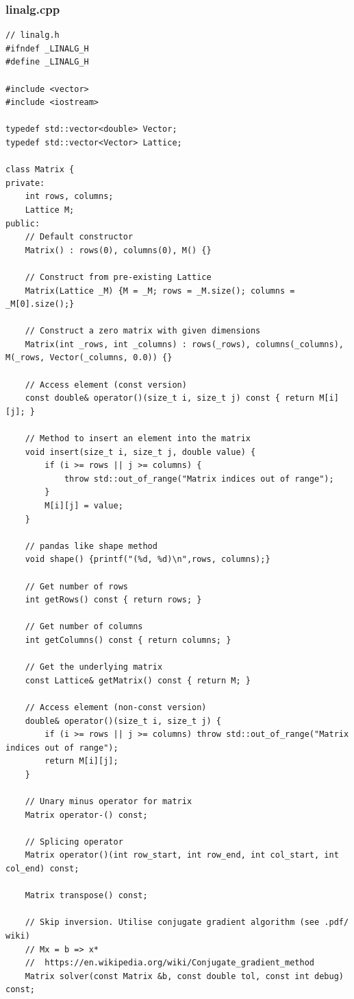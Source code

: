 \documentclass[12pt,twoside]{article}
\begin{document}
\subsubsection{linalg.cpp}
\scriptsize
\begin{verbatim}
// linalg.h
#ifndef _LINALG_H
#define _LINALG_H

#include <vector>
#include <iostream>

typedef std::vector<double> Vector;
typedef std::vector<Vector> Lattice;

class Matrix {
private:
    int rows, columns;
    Lattice M;
public:
    // Default constructor
    Matrix() : rows(0), columns(0), M() {}

    // Construct from pre-existing Lattice
    Matrix(Lattice _M) {M = _M; rows = _M.size(); columns = _M[0].size();}

    // Construct a zero matrix with given dimensions
    Matrix(int _rows, int _columns) : rows(_rows), columns(_columns), M(_rows, Vector(_columns, 0.0)) {}

    // Access element (const version)
    const double& operator()(size_t i, size_t j) const { return M[i][j]; }

    // Method to insert an element into the matrix
    void insert(size_t i, size_t j, double value) {
        if (i >= rows || j >= columns) {
            throw std::out_of_range("Matrix indices out of range");
        }
        M[i][j] = value;
    }

    // pandas like shape method
    void shape() {printf("(%d, %d)\n",rows, columns);}

    // Get number of rows
    int getRows() const { return rows; }

    // Get number of columns
    int getColumns() const { return columns; }

    // Get the underlying matrix
    const Lattice& getMatrix() const { return M; }

    // Access element (non-const version)
    double& operator()(size_t i, size_t j) {
        if (i >= rows || j >= columns) throw std::out_of_range("Matrix indices out of range");
        return M[i][j];
    }

    // Unary minus operator for matrix
    Matrix operator-() const;

    // Splicing operator
    Matrix operator()(int row_start, int row_end, int col_start, int col_end) const;

    Matrix transpose() const;

    // Skip inversion. Utilise conjugate gradient algorithm (see .pdf/ wiki)
    // Mx = b => x*
    //  https://en.wikipedia.org/wiki/Conjugate_gradient_method
    Matrix solver(const Matrix &b, const double tol, const int debug) const;


\end{verbatim}
\end{document}
